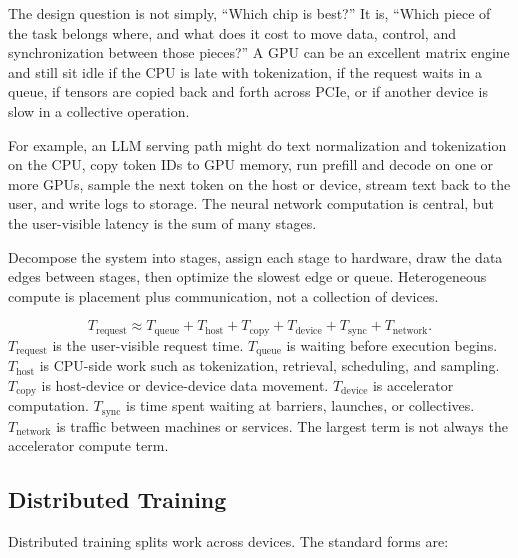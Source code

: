 The design question is not simply, ``Which chip is best?'' It is, ``Which piece of the task belongs where, and what does it cost to move data, control, and synchronization between those pieces?'' A GPU can be an excellent matrix engine and still sit idle if the CPU is late with tokenization, if the request waits in a queue, if tensors are copied back and forth across PCIe, or if another device is slow in a collective operation.

For example, an LLM serving path might do text normalization and tokenization on the CPU, copy token IDs to GPU memory, run prefill and decode on one or more GPUs, sample the next token on the host or device, stream text back to the user, and write logs to storage. The neural network computation is central, but the user-visible latency is the sum of many stages.

\begin{aside}
Decompose the system into stages, assign each stage to hardware, draw the data edges between stages, then optimize the slowest edge or queue. Heterogeneous compute is placement plus communication, not a collection of devices.
\end{aside}

\begin{keyequation}
\[
  T_{\text{request}} \approx
  T_{\text{queue}} +
  T_{\text{host}} +
  T_{\text{copy}} +
  T_{\text{device}} +
  T_{\text{sync}} +
  T_{\text{network}}.
\]
\tcblower
\(T_{\text{request}}\) is the user-visible request time. \(T_{\text{queue}}\) is waiting before execution begins. \(T_{\text{host}}\) is CPU-side work such as tokenization, retrieval, scheduling, and sampling. \(T_{\text{copy}}\) is host-device or device-device data movement. \(T_{\text{device}}\) is accelerator computation. \(T_{\text{sync}}\) is time spent waiting at barriers, launches, or collectives. \(T_{\text{network}}\) is traffic between machines or services. The largest term is not always the accelerator compute term.
\end{keyequation}

\subsection{Distributed Training}

Distributed training splits work across devices. The standard forms are:

